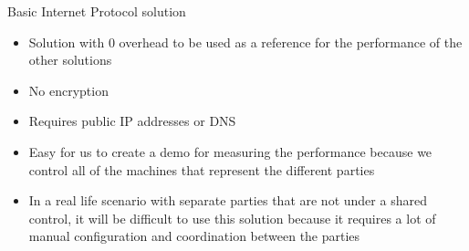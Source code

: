 \label{notes__02040-basic-ip.md}
\begin{block}{Basic Internet Protocol solution}
\label{notes__02040-basic-ip.md__basic-internet-protocol-solution}
\begin{itemize}
\tightlist
\item
  Solution with 0 overhead to be used as a reference for the performance of the other solutions
\item
  No encryption
\item
  Requires public IP addresses or DNS
\item
  Easy for us to create a demo for measuring the performance because we control all of the machines that represent the different parties
\item
  In a real life scenario with separate parties that are not under a shared control, it will be difficult to use this solution because it requires a lot of manual configuration and coordination between the parties
\end{itemize}
\end{block}

